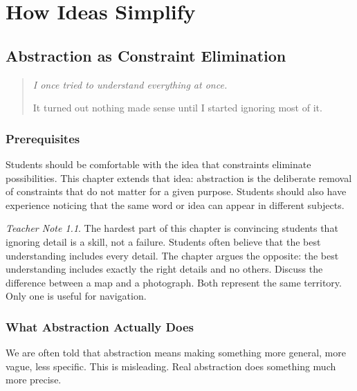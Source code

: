 \documentclass[11pt]{book}
\theoremstyle{definition}
\theoremstyle{remark}
\newtheorem{teachernote}{Teacher Note}[chapter]
\newenvironment{deepthought}
  {\begin{quote}\itshape}
  {\end{quote}}
\begin{document}
\part{How Ideas Simplify}

\chapter{Abstraction as Constraint Elimination}

\begin{deepthought}
I once tried to understand everything at once.

It turned out nothing made sense until I started ignoring most of it.
\end{deepthought}

\section*{Prerequisites}

Students should be comfortable with the idea that constraints eliminate
possibilities. This chapter extends that idea: abstraction is the
deliberate removal of constraints that do not matter for a given purpose.
Students should also have experience noticing that the same word or idea
can appear in different subjects.

\begin{teachernote}
The hardest part of this chapter is convincing students that ignoring
detail is a skill, not a failure. Students often believe that the best
understanding includes every detail. The chapter argues the opposite:
the best understanding includes exactly the right details and no others.
Discuss the difference between a map and a photograph. Both represent
the same territory. Only one is useful for navigation.
\end{teachernote}

\section{What Abstraction Actually Does}

We are often told that abstraction means making something more general,
more vague, less specific. This is misleading. Real abstraction does
something much more precise.
\end{document}

